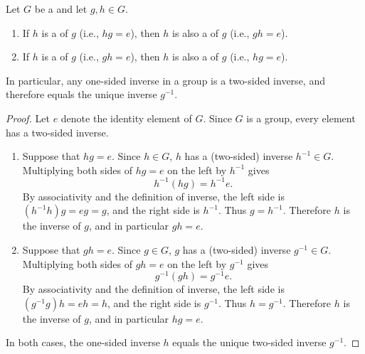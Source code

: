 \begin{lemma} \label{lemma:one_sided_inverse_is_two_sided_inverse_in_a_group}
    Let $G$ be a  and let $g,h \in G$.
    \begin{enumerate}
        \item If $h$ is a  of $g$ (i.e., $hg = e$), then $h$ is also a  of $g$ (i.e., $gh = e$).
        \item If $h$ is a  of $g$ (i.e., $gh = e$), then $h$ is also a  of $g$ (i.e., $hg = e$).
    \end{enumerate}
    In particular, any one-sided inverse in a group is a two-sided inverse, and therefore equals the unique inverse $g^{-1}$.
\end{lemma}
\begin{proof}
    Let $e$ denote the identity element of $G$. Since $G$ is a group, every element has a two-sided inverse.

    \begin{enumerate}
        \item Suppose that $hg = e$. Since $h \in G$, $h$ has a (two-sided) inverse $h^{-1} \in G$. Multiplying both sides of $hg = e$ on the left by $h^{-1}$ gives
        $$h^{-1}(hg) = h^{-1}e.$$
        By associativity and the definition of inverse, the left side is $(h^{-1}h)g = eg = g$, and the right side is $h^{-1}$. Thus $g = h^{-1}$. Therefore $h$ is the inverse of $g$, and in particular $gh = e$.

        \item Suppose that $gh = e$. Since $g \in G$, $g$ has a (two-sided) inverse $g^{-1} \in G$. Multiplying both sides of $gh = e$ on the left by $g^{-1}$ gives
        $$g^{-1}(gh) = g^{-1}e.$$
        By associativity and the definition of inverse, the left side is $(g^{-1}g)h = eh = h$, and the right side is $g^{-1}$. Thus $h = g^{-1}$. Therefore $h$ is the inverse of $g$, and in particular $hg = e$.
    \end{enumerate}

    In both cases, the one-sided inverse $h$ equals the unique two-sided inverse $g^{-1}$.
\end{proof}